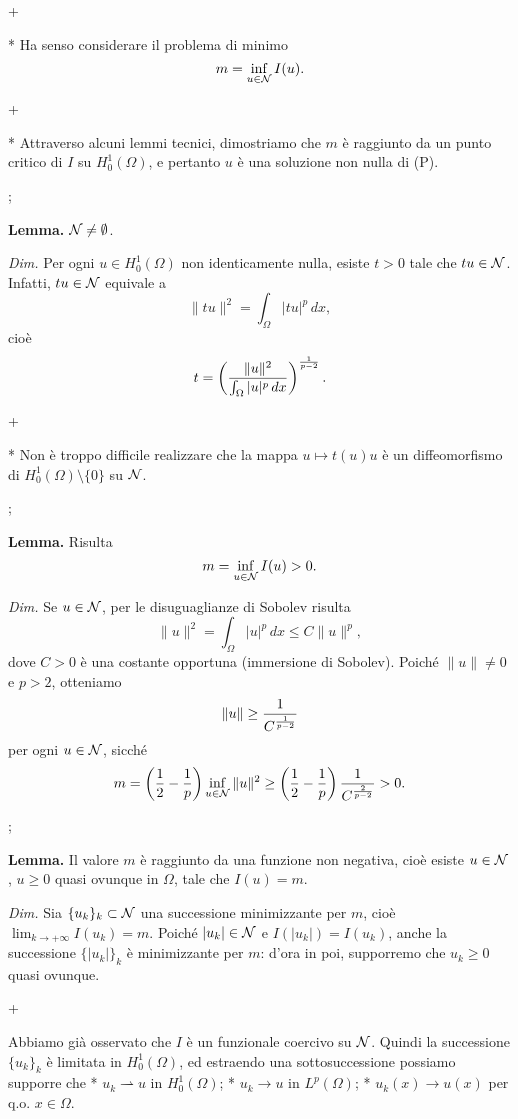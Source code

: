 \pg+

* Ha senso considerare il problema di minimo
$$
m = \inf_{u \in {\cal N}} I(u).
$$

\pg+

* Attraverso alcuni lemmi tecnici, dimostriamo che $m$ \`e raggiunto
  da un punto critico di $I$ su $H_0^1(\Omega)$, e pertanto $u$ \`e
  una soluzione non nulla di (P).

\pg;

{\bf Lemma.} ${\cal N} \neq \emptyset$.

{\em Dim.} Per ogni $u \in H_0^1(\Omega)$ non identicamente nulla,
esiste $t>0$ tale che $tu \in {\cal N}$. Infatti, $tu \in {\cal N}$
equivale a
$$
\|tu\|^2 = \int_\Omega |tu|^p \, dx,
$$
cio\`e
$$
t = \left( \frac{\|u\|^2}{\int_\Omega |u|^p \, dx} \right)^{{1 \over
p-2}}.
$$

\pg+

* Non \`e troppo difficile realizzare che la mappa $u \mapsto t(u)u$
  \`e un diffeomorfismo di $H_0^1(\Omega) \setminus \{0\}$ su ${\cal
  N}$.

\pg;

{\bf Lemma.} Risulta
$$
m = \inf_{u \in {\cal N}} I(u) > 0.
$$

{\em Dim.} Se $u \in {\cal N}$, per le disuguaglianze di Sobolev
risulta
$$
\|u\|^2 = \int_\Omega |u|^p \, dx \leq C \|u\|^p,
$$
dove $C>0$ \`e una costante opportuna (immersione di
Sobolev). Poich\'e $\|u\| \neq 0$ e $p>2$, otteniamo
$$
\|u\| \geq {1 \over C^{{1 \over p-2}}}
$$
per ogni $u \in {\cal N}$, sicch\'e
$$
m = \left( \frac12 - \frac1p \right) \inf_{u \in {\cal N}} \|u\|^2
\geq \left( \frac12 - \frac1p \right) {1 \over C^{{2 \over p-2}}} >0.
$$

\pg;

{\bf Lemma.} Il valore $m$ \`e raggiunto da una funzione non negativa,
cio\`e esiste $u \in {\cal N}$, $u \geq 0$ quasi ovunque in $\Omega$,
tale che $I(u)=m$.

{\em Dim.} Sia $\{u_k\}_k \subset {\cal N}$ una successione
minimizzante per $m$, cio\`e $\lim_{k \to +\infty} I(u_k) =
m$. Poich\'e $|u_k| \in {\cal N}$ e $I(|u_k|) = I(u_k)$, anche la
successione $\{|u_k|\}_k$ \`e minimizzante per $m$: d'ora in poi,
supporremo che $u_k \geq 0$ quasi ovunque.

\pg+

Abbiamo gi\`a osservato che $I$ \`e un funzionale coercivo su ${\cal
N}$. Quindi la successione $\{u_k\}_k$ \`e limitata in
$H_0^1(\Omega)$, ed estraendo una sottosuccessione possiamo supporre
che
\begitems
* $u_k \rightharpoonup u$ in $H_0^1(\Omega)$;
* $u_k \to u$ in $L^p(\Omega)$;
* $u_k(x) \to u(x)$ per q.o. $x \in \Omega$.
\enditems

